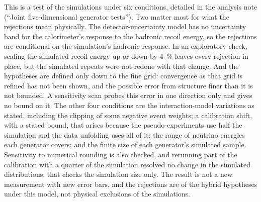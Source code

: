This is a test of the simulations under six conditions, detailed in the analysis note (``Joint five-dimensional generator tests''). Two matter most for what the rejections mean physically. The detector-uncertainty model has no uncertainty band for the calorimeter's response to the hadronic recoil energy, so the rejections are conditional on the simulation's hadronic response. In an exploratory check, scaling the simulated recoil energy up or down by \SI{4}{\percent} leaves every rejection in place, but the simulated repeats were not redone with that change. And the hypotheses are defined only down to the fine grid: convergence as that grid is refined has not been shown, and the possible error from structure finer than it is not bounded. A sensitivity scan probes this error in one direction only and gives no bound on it. The other four conditions are the interaction-model variations as stated, including the clipping of some negative event weights; a calibration shift, with a stated bound, that arises because the pseudo-experiments use half the simulation and the data unfolding uses all of it; the range of neutrino energies each generator covers; and the finite size of each generator's simulated sample. Sensitivity to numerical rounding is also checked, and rerunning part of the calibration with a quarter of the simulation resolved no change in the simulated distributions; that checks the simulation size only. The result is not a new measurement with new error bars, and the rejections are of the hybrid hypotheses under this model, not physical exclusions of the simulations.

